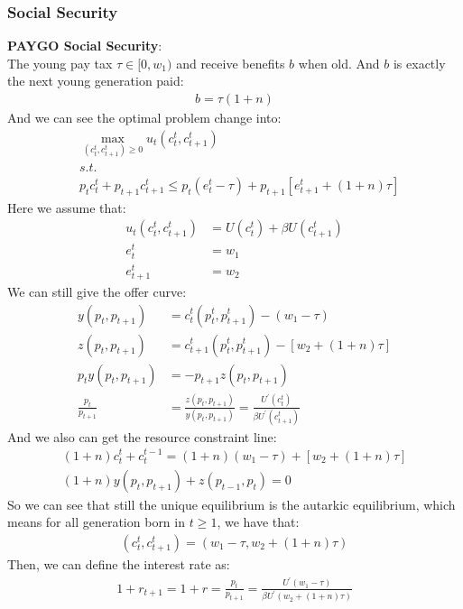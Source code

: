 \documentclass{article}
\begin{document}
\subsubsection{Social Security}
\textbf{PAYGO Social Security}:\\
The young pay tax $\tau \in [0, w_1)$ and receive benefits $b$ when old. And $b$ is exactly the next young generation paid:
	\begin{align*}
		b = \tau (1 + n)
	\end{align*}
And we can see the optimal problem change into:
	\begin{align*}
		&\mathop{max}\limits_{(c^t_t, c^t_{t+1}) \geq 0} u_t(c^t_t, c^t_{t+1})\\
		&s.t.\\
		&p_t c^t_t + p_{t+1} c^t_{t+1} \leq p_t (e^t_t - \tau) + p_{t+1} [e^t_{t+1} + (1 + n)\tau]
	\end{align*}
Here we assume that:
	\begin{align*}
		u_t(c^t_t, c^t_{t+1}) &= U(c^t_t) + \beta U(c^t_{t+1})\\
		e^t_t &= w_1\\
		e^t_{t+1} &= w_2
	\end{align*}
We can still give the offer curve:
	\begin{align*}
		y(p_t, p_{t+1}) &= c^t_t(p^t_t, p^t_{t+1}) - (w_1 - \tau)\\
		z(p_t, p_{t+1}) &= c^t_{t+1}(p^t_t, p^t_{t+1}) - [w_2 + (1 + n)\tau]\\
		p_t y(p_t, p_{t+1}) &= -p_{t+1} z(p_t, p_{t+1})\\
		\frac{p_t}{p_{t+1}} &= \frac{z(p_t, p_{t+1})}{y(p_t, p_{t+1})} = \frac{U^\prime (c^t_t)}{\beta U^\prime(c^t_{t+1})}
	\end{align*}
And we also can get the resource constraint line:
	\begin{align*}
		(1 + n) c^t_{t} + c^{t-1}_t = (1 + n)(w_1 - \tau) + [w_2 + (1+n) \tau]\\
		(1 + n) y(p_t, p_{t+1}) + z(p_{t-1}, p_t) = 0
	\end{align*}
So we can see that still the unique equilibrium is the autarkic equilibrium, which means for all generation born in $t \geq 1$, we have that:
	\begin{align*}
		(c^t_t, c^t_{t+1}) = (w_1 - \tau, w_2 + (1 + n)\tau)
	\end{align*} 
Then, we can define the interest rate as:
	\begin{align*}
		1 + r_{t+1} = 1 + r = \frac{p_t}{p_{t+1}} = \frac{U^\prime(w_1 - \tau)}{\beta U^\prime(w_2 + (1 + n)\tau)}
	\end{align*}
\end{document}
